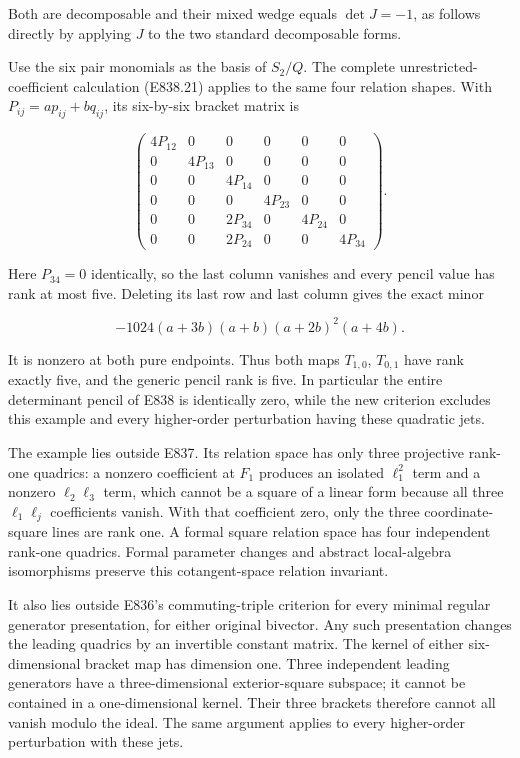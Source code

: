 Both are decomposable and their mixed wedge equals \(\det J=-1\), as
follows directly by applying \(J\) to the two standard decomposable
forms.

Use the six pair monomials as the basis of \(S_2/Q\). The complete
unrestricted-coefficient calculation (E838.21) applies to the same four
relation shapes. With \(P_{ij}=ap_{ij}+bq_{ij}\), its six-by-six bracket
matrix is

\[
 \begin{pmatrix}
 4P_{12}&0&0&0&0&0\\
 0&4P_{13}&0&0&0&0\\
 0&0&4P_{14}&0&0&0\\
 0&0&0&4P_{23}&0&0\\
 0&0&2P_{34}&0&4P_{24}&0\\
 0&0&2P_{24}&0&0&4P_{34}
 \end{pmatrix}.
 \tag{E839.13}
\]

Here \(P_{34}=0\) identically, so the last column vanishes and every
pencil value has rank at most five. Deleting its last row and last
column gives the exact minor

\[
 -1024(a+3b)(a+b)(a+2b)^2(a+4b).
 \tag{E839.14}
\]

It is nonzero at both pure endpoints. Thus both maps \(T_{1,0}\),
\(T_{0,1}\) have rank exactly five, and the generic pencil rank is five.
In particular the entire determinant pencil of E838 is identically zero,
while the new criterion excludes this example and every higher-order
perturbation having these quadratic jets.

The example lies outside E837. Its relation space has only three
projective rank-one quadrics: a nonzero coefficient at \(F_1\) produces
an isolated \(\ell_1^2\) term and a nonzero \(\ell_2\ell_3\) term, which
cannot be a square of a linear form because all three \(\ell_1\ell_j\)
coefficients vanish. With that coefficient zero, only the three
coordinate-square lines are rank one. A formal square relation space has
four independent rank-one quadrics. Formal parameter changes and
abstract local-algebra isomorphisms preserve this cotangent-space
relation invariant.

It also lies outside E836's commuting-triple criterion for every minimal
regular generator presentation, for either original bivector. Any such
presentation changes the leading quadrics by an invertible constant
matrix. The kernel of either six-dimensional bracket map has dimension
one. Three independent leading generators have a three-dimensional
exterior-square subspace; it cannot be contained in a one-dimensional
kernel. Their three brackets therefore cannot all vanish modulo the
ideal. The same argument applies to every higher-order perturbation with
these jets.

